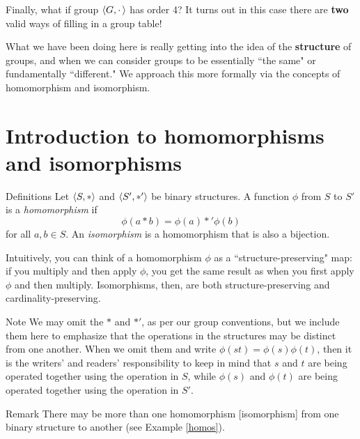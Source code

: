 Finally, what if group $\langle G, \cdot\,\rangle$ has order 4?  It turns out in this case there are \textbf{two} valid ways of filling in a group table!

\medskip
What we have been doing here is really getting into the idea of the
\textbf{structure} of groups, and when we can consider groups to be
essentially ``the same" or fundamentally ``different."  We approach
this more formally via the concepts of homomorphism and isomorphism.

\bigskip
\section{Introduction to homomorphisms and isomorphisms}

\begin{df}{Definitions} Let $\langle S,*\rangle$ and $\langle S',*'\rangle$ be binary structures.  A
function $\phi$ from $S$ to $S'$ is a \textit{homomorphism} if
$$\phi(a* b)=\phi(a)*'\phi(b)$$ for all $a,b\in S$. An \textit{isomorphism} is a homomorphism that is also a bijection.\end{df}

Intuitively, you can think of a homomorphism $\phi$ as a
``structure-preserving" map: if you multiply and then apply $\phi$,
you get the same result as when you first apply $\phi$ and then
multiply. Isomorphisms, then, are both structure-preserving and
cardinality-preserving.


\begin{df}{Note} We may omit the $*$ and $*'$, as per our group conventions, but we include them here to emphasize that the operations in the structures may be distinct from one another.  When we omit them and write $\phi(st)=\phi(s)\phi(t)$, then it is the writers' and readers' responsibility to keep in mind that $s$ and $t$ are being operated together using the operation in $S$, while $\phi(s)$ and $\phi(t)$ are being operated together using the operation in $S'$.\end{df}

\begin{df}{Remark} There may be more than one homomorphism
[isomorphism] from one binary structure to another (see Example
\ref{homos}). \end{df}



